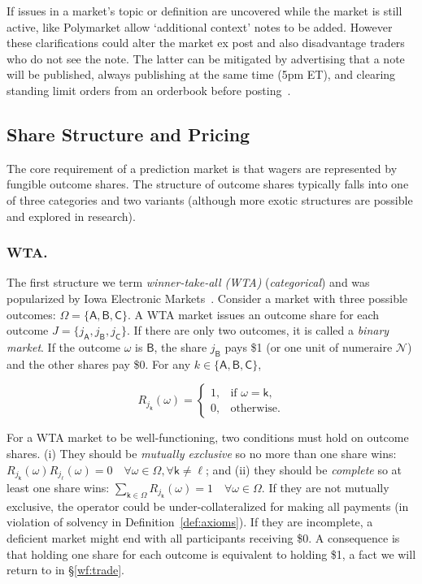 If issues in a market's topic or definition are uncovered while the market is still active, \depms like Polymarket allow `additional context' notes to be added. However these clarifications could alter the market ex post and also disadvantage traders who do not see the note. The latter can be mitigated by advertising that a note will be published, always publishing at the same time (\eg 5pm ET), and clearing standing limit orders from an orderbook before posting~\cite{poly}.


\subsection{Share Structure and Pricing}\label{wf:mech}\label{wf:price}

The core requirement of a prediction market is that wagers are represented by fungible outcome shares. The structure of outcome shares typically falls into one of three categories and two variants (although more exotic structures are possible and explored in research). 

\subsubsection{WTA.}

The first structure we term \textit{winner-take-all (WTA)} (\aka \textit{categorical}) and was popularized by Iowa Electronic Markets~\cite{iem}. Consider a market with three possible outcomes: $\Omega=\{\mathsf{A}, \mathsf{B}, \mathsf{C}\}$.  A WTA market issues an outcome share for each outcome $J=\{j_\mathsf{A}, j_\mathsf{B}, j_\mathsf{C}\}$. If there are only two outcomes, it is called a \textit{binary market}. If the outcome $\omega$ is $\mathsf{B}$, the share $j_\mathsf{B}$ pays \$1 (or one unit of numeraire $\mathcal{N}$) and the other shares pay \$0.  For any $k\in\{\mathsf{A},\mathsf{B},\mathsf{C}\}$,

\begin{equation}
R_{j_{\mathsf{k}}}(\omega)=\begin{cases}1, & \text{if } \omega=\mathsf{k},\\0, & \text{otherwise.}\end{cases}
\end{equation}

For a WTA market to be well-functioning, two conditions must hold on outcome shares. (i) They should be \textit{mutually exclusive} so no more than one share wins: $R_{j_{\mathsf{k}}}(\omega)R_{j_{\mathsf{\ell}}}(\omega)=0 \quad \forall\omega\in\Omega, \forall\mathsf{k}\neq\mathsf{\ell} $; and (ii) they should be \textit{complete} so at least one share wins: $\sum_{\mathsf{k}\in\Omega} R_{j_{\mathsf{k}}}(\omega)=1\quad \forall \omega\in\Omega$. If they are not mutually exclusive, the operator could be under-collateralized for making all payments (in violation of solvency in Definition~\ref{def:axioms}). If they are incomplete, a deficient market might end with all participants receiving \$0. A consequence is that holding one share for each outcome is equivalent to holding \$1, a fact we will return to in \S\ref{wf:trade}. 

